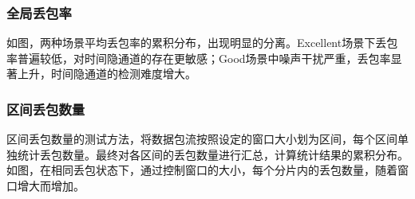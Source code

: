 \subsubsection{全局丢包率}
\label{chap:analyze:results:plr:global}


如图，两种场景平均丢包率的累积分布，出现明显的分离。Excellent场景下丢包率普遍较低，对时间隐通道的存在更敏感；Good场景中噪声干扰严重，丢包率显著上升，时间隐通道的检测难度增大。

\subsubsection{区间丢包数量}
\label{chap:analyze:results:plr:window}

区间丢包数量的测试方法，将数据包流按照设定的窗口大小划为区间，每个区间单独统计丢包数量。最终对各区间的丢包数量进行汇总，计算统计结果的累积分布。如图，在相同丢包状态下，通过控制窗口的大小，每个分片内的丢包数量，随着窗口增大而增加。



